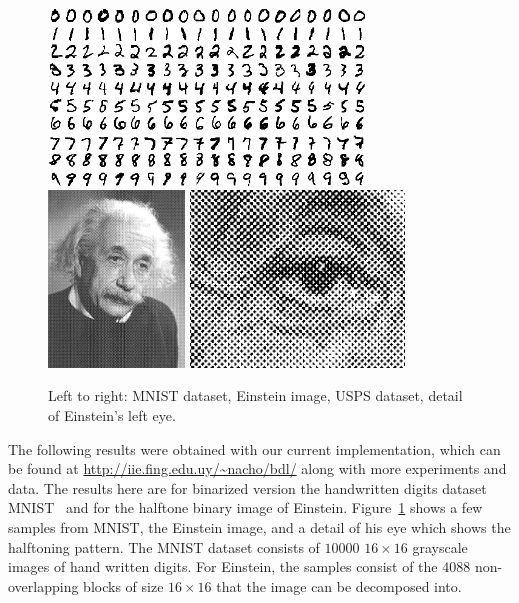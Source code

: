 \documentclass[twocolumn]{IEEEtran}
\theoremstyle{definition}
\begin{document}
\begin{figure}[t]
\centering%
\includegraphics[height=1.85in]{fig/mnist_bin.png} %
\includegraphics[height=1.85in]{fig/einstein.png} %
\includegraphics[height=1.85in]{fig/einstein_zoom3.png}
\caption{\label{fig:datasets} Left to right: MNIST dataset, Einstein image, USPS dataset,  detail of Einstein's left eye.}
\end{figure}
%
The following results were obtained with our current implementation, which can be found at \url{http://iie.fing.edu.uy/~nacho/bdl/} along with more experiments and data. The results here are for binarized version the handwritten digits dataset MNIST~\cite{mnist} and for the halftone binary image of Einstein. Figure~\ref{fig:datasets} shows a few samples from MNIST, the Einstein image, and a detail of his eye which shows the halftoning pattern. The MNIST dataset consists of $10000$ $16{\times}16$ grayscale images of hand written digits. For Einstein, the samples consist of the $4088$ non-overlapping blocks of size $16{\times}16$ that the image can be decomposed into.
\end{document}
